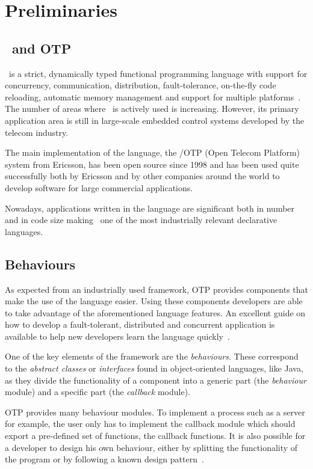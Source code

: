 \chapter{Preliminaries}
\label{chp:preliminaries}

\section{\er\ and OTP}
\label{sct:erlang_preliminaries}

\er\ is a strict, dynamically typed functional programming language
with support for concurrency, communication, distribution,
fault-tolerance, on-the-fly code reloading, automatic memory
management and support for multiple platforms~\cite{joe_book1}. The
number of areas where \er\ is actively used is increasing. However,
its primary application area is still in large-scale embedded control
systems developed by the telecom industry.

The main implementation of the language, the \er/OTP (Open Telecom
Platform) system from Ericsson, has been open source since 1998 and
has been used quite successfully both by Ericsson and by other
companies around the world to develop software for large commercial
applications.

Nowadays, applications written in the language are significant both in
number and in code size making \er\ one of the most industrially
relevant declarative languages.

\section{Behaviours}
\label{sct:behaviour_preliminaries}

As expected from an industrially used framework, OTP provides
components that make the use of the language easier. Using these
components developers are able to take advantage of the aforementioned
language features. An excellent guide on how to develop a
fault-tolerant, distributed and concurrent application is available to
help new developers learn the language quickly~\cite{des_princ}.

One of the key elements of the framework are the
\emph{behaviours}. These correspond to the \emph{abstract classes} or
\emph{interfaces} found in object-oriented languages, like Java, as
they divide the functionality of a component into a generic part (the
\emph{behaviour} module) and a specific part (the \emph{callback}
module).

OTP provides many behaviour modules. To implement a process such as a
server for example, the user only has to implement the callback module
which should export a pre-defined set of functions, the callback
functions. It is also possible for a developer to design his own
behaviour, either by splitting the functionality of the program or by
following a known design pattern~\cite{behaviours}.

